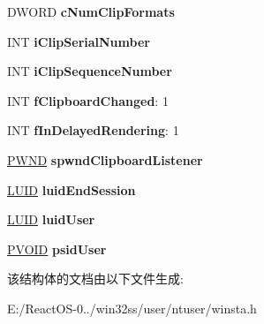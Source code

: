 \begin{DoxyCompactItemize}
D\+W\+O\+RD {\bfseries c\+Num\+Clip\+Formats}
\item 
\mbox{\label{struct___w_i_n_s_t_a_t_i_o_n___o_b_j_e_c_t_a71a523b1c0f57422166a289fdeb8170c}} 
I\+NT {\bfseries i\+Clip\+Serial\+Number}
\item 
\mbox{\label{struct___w_i_n_s_t_a_t_i_o_n___o_b_j_e_c_t_aceaff4fc3f7cdd0690ff378719f73fda}} 
I\+NT {\bfseries i\+Clip\+Sequence\+Number}
\item 
\mbox{\label{struct___w_i_n_s_t_a_t_i_o_n___o_b_j_e_c_t_ab59f31842685af56f76ec92b1a6db72a}} 
I\+NT {\bfseries f\+Clipboard\+Changed}\+: 1
\item 
\mbox{\label{struct___w_i_n_s_t_a_t_i_o_n___o_b_j_e_c_t_a0fcfdb77e5f08b239246164abb98cd04}} 
I\+NT {\bfseries f\+In\+Delayed\+Rendering}\+: 1
\item 
\mbox{\label{struct___w_i_n_s_t_a_t_i_o_n___o_b_j_e_c_t_a974823603ba0da66763a67affd5c4626}} 
\hyperlink{struct___w_n_d}{P\+W\+ND} {\bfseries spwnd\+Clipboard\+Listener}
\item 
\mbox{\label{struct___w_i_n_s_t_a_t_i_o_n___o_b_j_e_c_t_ac9996f141c28a1a1050470433b0159bc}} 
\hyperlink{struct___l_u_i_d}{L\+U\+ID} {\bfseries luid\+End\+Session}
\item 
\mbox{\label{struct___w_i_n_s_t_a_t_i_o_n___o_b_j_e_c_t_add83a6052b7085bdd15d562172f1b2a2}} 
\hyperlink{struct___l_u_i_d}{L\+U\+ID} {\bfseries luid\+User}
\item 
\mbox{\label{struct___w_i_n_s_t_a_t_i_o_n___o_b_j_e_c_t_ae352c9f87b44dcb253d0c58567a091e0}} 
\hyperlink{interfacevoid}{P\+V\+O\+ID} {\bfseries psid\+User}
\end{DoxyCompactItemize}


该结构体的文档由以下文件生成\+:\begin{DoxyCompactItemize}
\item 
E\+:/\+React\+O\+S-\/0../win32ss/user/ntuser/winsta.\+h\end{DoxyCompactItemize}
